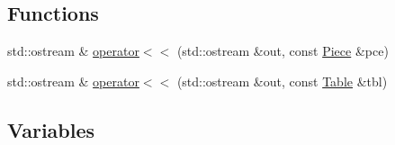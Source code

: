\subsection*{Functions}
\begin{DoxyCompactItemize}
\item 
std::ostream \& \hyperlink{namespaceChEngn_a26a6ae0dee7ff3917e673a622e749381}{operator$<$$<$} (std::ostream \&out, const \hyperlink{classChEngn_1_1Piece}{Piece} \&pce)
\item 
std::ostream \& \hyperlink{namespaceChEngn_ab50263763556397916f36ce2728ecf88}{operator$<$$<$} (std::ostream \&out, const \hyperlink{classChEngn_1_1Table}{Table} \&tbl)
\end{DoxyCompactItemize}
\subsection*{Variables}
